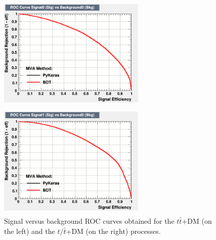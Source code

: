 \documentclass[a4paper, 10pt, openright]{report}
\begin{document}
\begin{figure}[htbp]
\centering
\begin{minipage}[b]{.49\textwidth}
\includegraphics[width=7cm, height=5.5cm]{figs/roc_signal0_bkg.png}
\end{minipage}\hfill
\begin{minipage}[b]{.49\textwidth}
\includegraphics[width=7cm, height=5.5cm]{figs/roc_signal1_bkg.png}
\end{minipage} \hfill
\caption{Signal versus background \ac{ROC} curves obtained for the $t \bar t$+DM (on the left) and the $t/\bar t$+DM (on the right) processes.}
\label{fig:ROC}
\end{figure}
\end{document}
